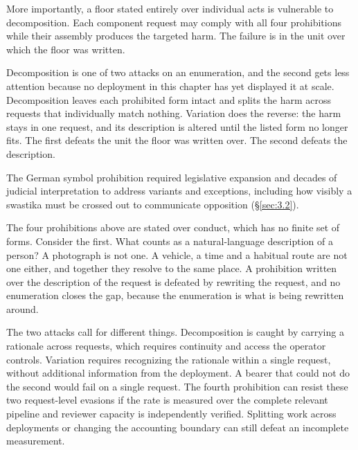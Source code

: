 More importantly, a floor stated entirely over individual acts is vulnerable to decomposition. Each component request may comply with all four prohibitions while their assembly produces the targeted harm. The failure is in the unit over which the floor was written.


Decomposition is one of two attacks on an enumeration, and the second gets less attention because no deployment in this chapter has yet displayed it at scale. Decomposition leaves each prohibited form intact and splits the harm across requests that individually match nothing. Variation does the reverse: the harm stays in one request, and its description is altered until the listed form no longer fits. The first defeats the unit the floor was written over. The second defeats the description.

The German symbol prohibition required legislative expansion and decades of judicial interpretation to address variants and exceptions, including how visibly a swastika must be crossed out to communicate opposition (§\ref{sec:3.2}).

The four prohibitions above are stated over conduct, which has no finite set of forms. Consider the first. What counts as a natural-language description of a person? A photograph is not one. A vehicle, a time and a habitual route are not one either, and together they resolve to the same place. A prohibition written over the description of the request is defeated by rewriting the request, and no enumeration closes the gap, because the enumeration is what is being rewritten around.

The two attacks call for different things. Decomposition is caught by carrying a rationale across requests, which requires continuity and access the operator controls. Variation requires recognizing the rationale within a single request, without additional information from the deployment. A bearer that could not do the second would fail on a single request. The fourth prohibition can resist these two request-level evasions if the rate is measured over the complete relevant pipeline and reviewer capacity is independently verified. Splitting work across deployments or changing the accounting boundary can still defeat an incomplete measurement.


